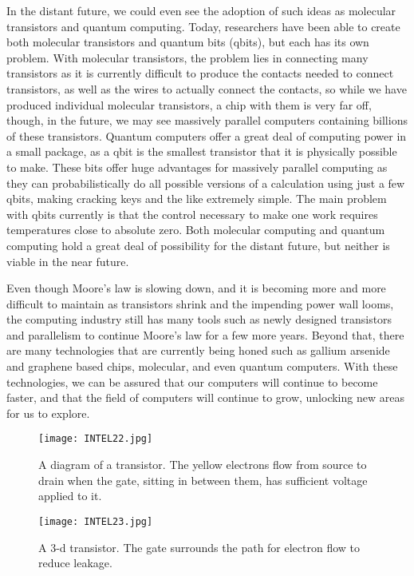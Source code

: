 \documentclass[12pt]{article}
\begin{document}
In the distant future, we could even see the adoption of such ideas as molecular transistors and quantum computing. Today, researchers have been able to create both molecular transistors and quantum bits (qbits), but each has its own problem. With molecular transistors, the problem lies in connecting many transistors as it is currently difficult to produce the contacts needed to connect transistors, as well as the wires to actually connect the contacts, so while we have produced individual molecular transistors, a chip with them is very far off, though, in the future, we may see massively parallel computers containing billions of these transistors\cite{ganapati_first_????}. Quantum computers offer a great deal of computing power in a small package, as a qbit is the smallest transistor that it is physically possible to make. These bits offer huge advantages for massively parallel computing as they can probabilistically do all possible versions of a calculation using just a few qbits, making cracking keys and the like extremely simple. The main problem with qbits currently is that the control necessary to make one work requires temperatures close to absolute zero. Both molecular computing and quantum computing hold a great deal of possibility for the distant future, but neither is viable in the near future.

Even though Moore's law is slowing down, and it is becoming more and more difficult to maintain as transistors shrink and the impending power wall looms, the computing industry still has many tools such as newly designed transistors and parallelism to continue Moore's law for a few more years. Beyond that, there are many technologies that are currently being honed such as gallium arsenide and graphene based chips, molecular, and even quantum computers. With these technologies, we can be assured that our computers will continue to become faster, and that the field of computers will continue to grow, unlocking new areas for us to explore.











\begin{figure}[b]
\texttt{[image: INTEL22.jpg]}
\caption{\label{fig:regular transistor}A diagram of a transistor. The yellow electrons flow from source to drain when the gate, sitting in between them, has sufficient voltage applied to it.}
\end{figure}

\begin{figure}[b]
\texttt{[image: INTEL23.jpg]}
\caption{\label{fig:regular transistor}A 3-d transistor. The gate surrounds the path for electron flow to reduce leakage.}
\end{figure}
\end{document}
